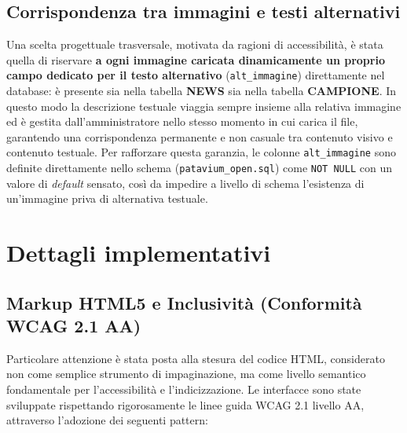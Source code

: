 \documentclass[11pt,a4paper]{article}
\begin{document}
\subsection{Corrispondenza tra immagini e testi alternativi}
Una scelta progettuale trasversale, motivata da ragioni di accessibilità, è stata quella di riservare \textbf{a ogni immagine caricata dinamicamente un proprio campo dedicato per il testo alternativo} (\texttt{alt\_immagine}) direttamente nel database: è presente sia nella tabella \textbf{NEWS} sia nella tabella \textbf{CAMPIONE}. In questo modo la descrizione testuale viaggia sempre insieme alla relativa immagine ed è gestita dall'amministratore nello stesso momento in cui carica il file, garantendo una corrispondenza permanente e non casuale tra contenuto visivo e contenuto testuale. Per rafforzare questa garanzia, le colonne \texttt{alt\_immagine} sono definite direttamente nello schema (\texttt{patavium\_open.sql}) come \texttt{NOT NULL} con un valore di \textit{default} sensato, così da impedire a livello di schema l'esistenza di un'immagine priva di alternativa testuale.

\section{Dettagli implementativi}
\subsection{Markup HTML5 e Inclusività (Conformità WCAG 2.1 AA)}

Particolare attenzione è stata posta alla stesura del codice HTML, considerato non come semplice strumento di impaginazione, ma come livello semantico fondamentale per l'accessibilità e l'indicizzazione. Le interfacce sono state sviluppate rispettando rigorosamente le linee guida WCAG 2.1 livello AA, attraverso l'adozione dei seguenti pattern:
\end{document}
